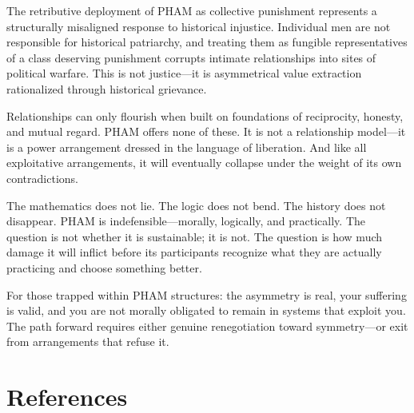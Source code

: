 \documentclass[12pt,openany]{book}
\numberwithin{equation}{chapter}
\begin{document}
The retributive deployment of PHAM as collective punishment represents a structurally misaligned response to historical injustice. Individual men are not responsible for historical patriarchy, and treating them as fungible representatives of a class deserving punishment corrupts intimate relationships into sites of political warfare. This is not justice---it is asymmetrical value extraction rationalized through historical grievance.

Relationships can only flourish when built on foundations of reciprocity, honesty, and mutual regard. PHAM offers none of these. It is not a relationship model---it is a power arrangement dressed in the language of liberation. And like all exploitative arrangements, it will eventually collapse under the weight of its own contradictions.

The mathematics does not lie. The logic does not bend. The history does not disappear. PHAM is indefensible---morally, logically, and practically. The question is not whether it is sustainable; it is not. The question is how much damage it will inflict before its participants recognize what they are actually practicing and choose something better.

For those trapped within PHAM structures: the asymmetry is real, your suffering is valid, and you are not morally obligated to remain in systems that exploit you. The path forward requires either genuine renegotiation toward symmetry---or exit from arrangements that refuse it.

\chapter*{References}
\end{document}

